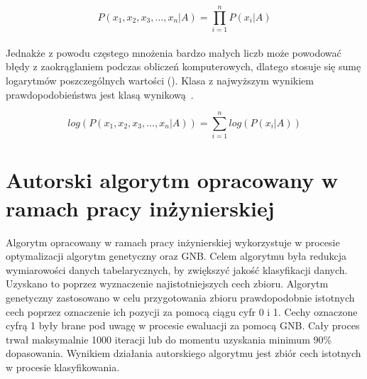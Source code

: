 \begin{equation}\label{math:gnb2}
P(x_1,x_2,x_3,...,x_n|A) = \prod_{i=1}^{n}P(x_i|A)
\end{equation}
\ \\
Jednakże z powodu częstego mnożenia bardzo małych liczb może powodować błędy z zaokrąglaniem podczas obliczeń komputerowych, dlatego stosuje się sumę logarytmów poszczególnych wartości (). Klasa z najwyższym wynikiem prawdopodobieństwa jest klasą wynikową~\cite{GNBalg}.

\begin{equation}\label{math:gnb3}
log(P(x_1,x_2,x_3,...,x_n|A)) = \sum_{i=1}^{n}log(P(x_i|A))
\end{equation}

\section{Autorski algorytm opracowany w ramach pracy inżynierskiej}
Algorytm opracowany w ramach pracy inżynierskiej wykorzystuje w procesie optymalizacji algorytm genetyczny oraz GNB. Celem algorytmu była redukcja wymiarowości danych tabelarycznych, by zwiększyć jakość klasyfikacji danych. Uzyskano to poprzez wyznaczenie najistotniejszych cech zbioru. Algorytm genetyczny zastosowano w celu przygotowania zbioru prawdopodobnie istotnych cech poprzez oznaczenie ich pozycji za pomocą ciągu cyfr 0 i 1. Cechy oznaczone cyfrą 1 były brane pod uwagę w procesie ewaluacji za pomocą GNB. Cały proces trwał maksymalnie 1000 iteracji lub do momentu uzyskania minimum $90\%$ dopasowania. Wynikiem działania autorskiego algorytmu jest zbiór cech istotnych w procesie klasyfikowania.

